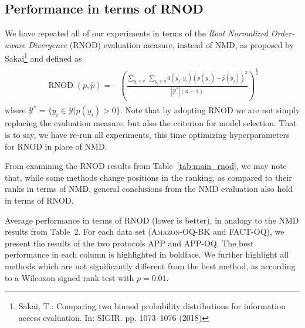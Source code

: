 \documentclass[10pt,a4paper]{article}
\DeclareMathOperator{\rnod}{RNOD}
\begin{document}



\subsection{Performance in terms of RNOD}

\noindent We have repeated all of our experiments in terms of the
\emph{Root Normalized Order-aware Divergence} (RNOD) evaluation
measure, instead of NMD, as proposed by Sakai\footnote{Sakai, T.:
Comparing two binned probability distributions for information access
evaluation. In: SIGIR. pp. 1073–1076 (2018) }
and defined as
%
\begin{align}
  \begin{split}
    \label{eq:RNOD}
    \rnod(p,\hat{p}) = & \left(\frac{\sum_{y_{i}\in\mathcal{Y}^{*}}
      \sum_{y_{j}\in\mathcal{Y}}d(y_{j},y_{i})(p(y_{j})-\hat{p}(y_{j}))^{2}}{|\mathcal{Y}^{*}|(n-1)}\right)^{\frac{1}{2}}
  \end{split}
\end{align}
% 
\noindent where
$\mathcal{Y}^{*}=\{y_{i}\in\mathcal{Y}|p(y_{i})>0\}$. Note that by
adopting RNOD we are not simply replacing the evaluation measure, but
also the criterion for model selection. That is to say, we have re-run
all experiments, this time optimizing hyperparameters for RNOD in
place of NMD.

From examining the RNOD results from Table~\ref{tab:main_rnod}, we may
note that, while some methods change positions in the ranking, as
compared to their ranks in terms of NMD, general conclusions from the
NMD evaluation also hold in terms of RNOD.

\begin{table}
  \centering
  \caption{Average performance in terms of RNOD (lower is better), in
  analogy to the NMD results from Table~2. For each data set
  (\textsc{Amazon-OQ-BK} and \textsc{FACT-OQ}), we present the results
  of the two protocols APP and \mbox{APP-OQ}. The best performance in
  each column is highlighted in boldface. We further highlight all
  methods which are not significantly different from the best method,
  as according to a Wilcoxon signed rank test with $p=0.01$.}
  \label{tab:main_rnod}
  \scriptsize 
\end{table}
\end{document}
